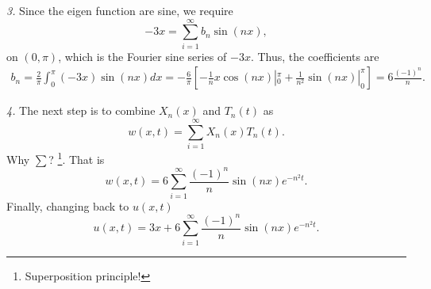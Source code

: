 \documentclass[11pt]{article}
\begin{document}
\begin{solution}
\textsl{3.} Since the eigen function are sine, we require
\[-3x=\sum_{i=1}^{\infty}b_{n}\sin(nx),\]
on $(0,\pi)$, which is the Fourier sine series of $-3x$. Thus, the coefficients are
\begin{align*}
b_{n}=\frac{2}{\pi}\int_{0}^{\pi}(-3x)\sin(nx)dx=-\frac{6}{\pi}\left[ -\frac{1}{n}x\cos(nx)|^{\pi}_{0} + \frac{1}{n^{2}}\sin(nx)|^{\pi}_{0} \right] = 6\frac{(-1)^{n}}{n}.
\end{align*}


\textsl{4. } The next step is to combine $X_{n}(x)$ and $T_{n}(t)$ as 
\[w(x,t)=\sum_{i=1}^{\infty}X_{n}(x)T_{n}(t).\]
Why $\textstyle \sum$? \footnote{Superposition principle!}. That is 
\[w(x, t) = 6 \sum_{i=1}^{\infty}\frac{(-1)^{n}}{n}\sin(nx)e^{-n^{2}t}.\]
Finally, changing back to $u(x,t)$
\[\boxed{u(x, t) = 3x + 6 \sum_{i=1}^{\infty}\frac{(-1)^{n}}{n}\sin(nx)e^{-n^{2}t}}.\]
\end{solution}
\end{document}
